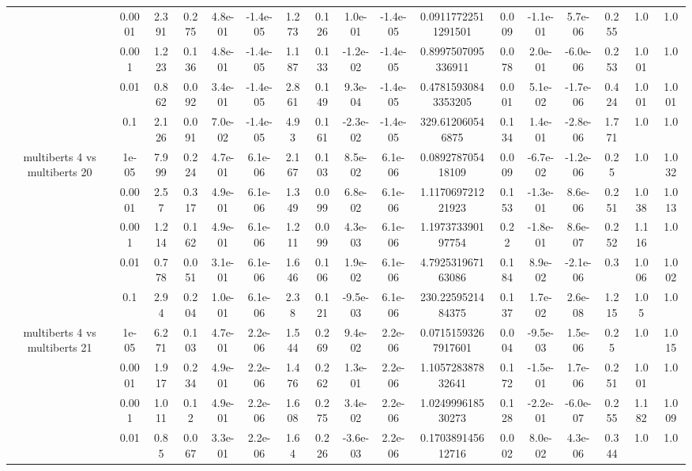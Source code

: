 \begin{tabular}{|c|c|c|c|c|c|c|c|c|c|c|c|c|c|c|c|c|}
 & 0.0001 & 2.391 & 0.275 & 4.8e-01 & -1.4e-05 & 1.273 & 0.126 & 1.0e-01 & -1.4e-05 & 0.09117722511291501 & 0.009 & -1.1e-01 & 5.7e-06 & 0.255 & 1.0 & 1.0 \\
 & 0.001 & 1.223 & 0.136 & 4.8e-01 & -1.4e-05 & 1.187 & 0.133 & -1.2e-02 & -1.4e-05 & 0.8997507095336911 & 0.078 & 2.0e-01 & -6.0e-06 & 0.253 & 1.001 & 1.0 \\
 & 0.01 & 0.862 & 0.092 & 3.4e-01 & -1.4e-05 & 2.861 & 0.149 & 9.3e-04 & -1.4e-05 & 0.47815930843353205 & 0.001 & 5.1e-02 & -1.7e-06 & 0.424 & 1.001 & 1.001 \\
 & 0.1 & 2.126 & 0.091 & 7.0e-02 & -1.4e-05 & 4.93 & 0.161 & -2.3e-02 & -1.4e-05 & 329.612060546875 & 0.134 & 1.4e-01 & -2.8e-06 & 1.771 & 1.0 & 1.0 \\
\hline
\multirow{5}{*}{multiberts 4 vs multiberts 20} & 1e-05 & 7.999 & 0.224 & 4.7e-01 & 6.1e-06 & 2.167 & 0.103 & 8.5e-02 & 6.1e-06 & 0.089278705418109 & 0.009 & -6.7e-02 & -1.2e-06 & 0.25 & 1.0 & 1.032 \\
 & 0.0001 & 2.57 & 0.317 & 4.9e-01 & 6.1e-06 & 1.349 & 0.099 & 6.8e-02 & 6.1e-06 & 1.117069721221923 & 0.153 & -1.3e-01 & 8.6e-06 & 0.251 & 1.038 & 1.013 \\
 & 0.001 & 1.214 & 0.162 & 4.9e-01 & 6.1e-06 & 1.211 & 0.099 & 4.3e-03 & 6.1e-06 & 1.197373390197754 & 0.22 & -1.8e-01 & 8.6e-07 & 0.252 & 1.116 & 1.0 \\
 & 0.01 & 0.778 & 0.051 & 3.1e-01 & 6.1e-06 & 1.646 & 0.106 & 1.9e-02 & 6.1e-06 & 4.792531967163086 & 0.184 & 8.9e-02 & -2.1e-06 & 0.3 & 1.006 & 1.002 \\
 & 0.1 & 2.94 & 0.204 & 1.0e-01 & 6.1e-06 & 2.38 & 0.121 & -9.5e-03 & 6.1e-06 & 230.2259521484375 & 0.137 & 1.7e-02 & 2.6e-08 & 1.215 & 1.05 & 1.0 \\
\hline
\multirow{5}{*}{multiberts 4 vs multiberts 21} & 1e-05 & 6.271 & 0.103 & 4.7e-01 & 2.2e-06 & 1.544 & 0.269 & 9.4e-02 & 2.2e-06 & 0.07151593267917601 & 0.004 & -9.5e-03 & 1.5e-06 & 0.25 & 1.0 & 1.015 \\
 & 0.0001 & 1.917 & 0.234 & 4.9e-01 & 2.2e-06 & 1.476 & 0.262 & 1.3e-01 & 2.2e-06 & 1.105728387832641 & 0.172 & -1.5e-01 & 1.7e-06 & 0.251 & 1.001 & 1.0 \\
 & 0.001 & 1.011 & 0.12 & 4.9e-01 & 2.2e-06 & 1.608 & 0.275 & 3.4e-02 & 2.2e-06 & 1.024999618530273 & 0.128 & -2.2e-01 & -6.0e-07 & 0.255 & 1.182 & 1.009 \\
 & 0.01 & 0.85 & 0.067 & 3.3e-01 & 2.2e-06 & 1.64 & 0.226 & -3.6e-03 & 2.2e-06 & 0.170389145612716 & 0.002 & 8.0e-02 & 4.3e-06 & 0.344 & 1.0 & 1.0 \\

\end{tabular}
